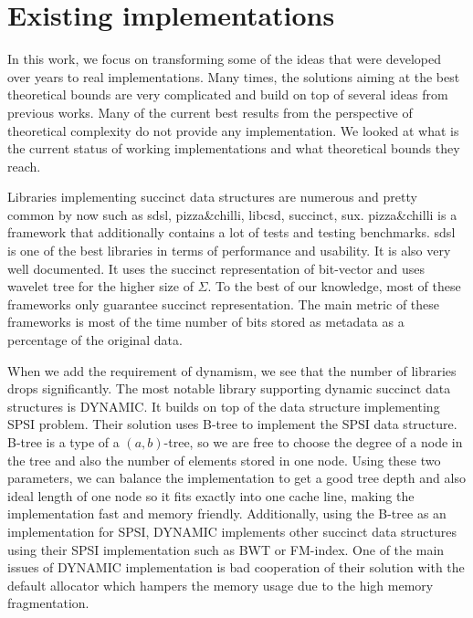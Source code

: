\section{Existing implementations}

In this work, we focus on transforming some of the ideas that were developed over years to real implementations. Many times, the solutions aiming at the best theoretical bounds are very complicated and build on top of several ideas from previous works. Many of the current best results from the perspective of theoretical complexity do not provide any implementation. We looked at what is the current status of working implementations and what theoretical bounds they reach.

Libraries implementing succinct data structures are numerous and pretty common by now such as sdsl\cite{gog2014theory}, pizza\&chilli\cite{pizza-chilli}, libcsd\cite{brisaboa2011compressed}, succinct\cite{succinct}, sux\cite{sux}. pizza\&chilli is a framework that additionally contains a lot of tests and testing benchmarks. sdsl is one of the best libraries in terms of performance and usability. It is also very well documented. It uses the succinct representation of bit-vector and uses wavelet tree for the higher size of $\Sigma$. To the best of our knowledge, most of these frameworks only guarantee succinct representation. The main metric of these frameworks is most of the time number of bits stored as metadata as a percentage of the original data.

When we add the requirement of dynamism, we see that the number of libraries drops significantly. The most notable library supporting 
dynamic succinct data structures is DYNAMIC\cite{prezza2017framework}. It builds on top of the data structure implementing SPSI problem. Their solution uses B-tree to implement the SPSI data structure. B-tree is a type of a $(a, b)$-tree, so we are free to choose the degree of a node in the tree and also the number of elements stored in one node. Using these two parameters, we can balance the implementation to get a good tree depth and also ideal length of one node so it fits exactly into one cache line, making the implementation fast and memory friendly. Additionally, using the B-tree as an implementation for SPSI, DYNAMIC implements other succinct
data structures using their SPSI implementation such as BWT or FM-index. One of the main issues of DYNAMIC implementation is bad cooperation of their solution with the default allocator which hampers the memory usage due to the high memory fragmentation.


